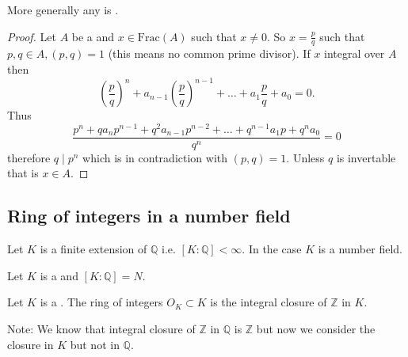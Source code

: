 \begin{remark}
  More generally any
   is .
  \begin{proof}
    Let $A$ be a  and $x \in \mathrm {Frac}(A)$ such
    that $x \ne 0$. So
    $x = \frac{p}{q}$ such that $p,q \in A, \left(p, q\right) = 1$
    (this means no common prime divisor). If $x$ integral over $A$
    then
    \[
    \left(\frac{p}{q}\right)^n + a_{n-1}\left(\frac{p}{q}\right)^{n-1}
    + \dots + a_1 \frac{p}{q} + a_0 = 0.
    \]
    Thus
    \[
    \frac{p^n + q a_n p^{n-1} + q^2 a_{n-1} p^{n-2} + \dots + q^{n-1}
      a_1 p + q^n a_0}{q^n} = 0
    \]
    therefore $q \mid p^n$ which is in contradiction with
    $\left(p, q\right) = 1$. Unless $q$ is invertable that is $x \in A$.
    \end{proof}
\end{remark}

\subsection{Ring of integers in a number field}

\begin{definition}
  Let $K$ is a finite extension of $\mathbb{Q}$ i.e.
  $\left[K:\mathbb{Q}\right] < \infty$. In the case $K$ is a number
  field. 
  \label{def:numberfield}
\end{definition}

Let $K$ is a  and $\left[K:\mathbb{Q}\right]
= N$.
\begin{definition}
  Let $K$ is a . The ring of integers
  $O_K \subset K$ is the integral closure of $\mathbb{Z}$
  in $K$. 

  Note: We know that integral closure of $\mathbb{Z}$ in $\mathbb{Q}$
  is $\mathbb{Z}$ but now we consider the closure in $K$ but not in
  $\mathbb{Q}$. 
  \label{def:ringintegers}
\end{definition}


